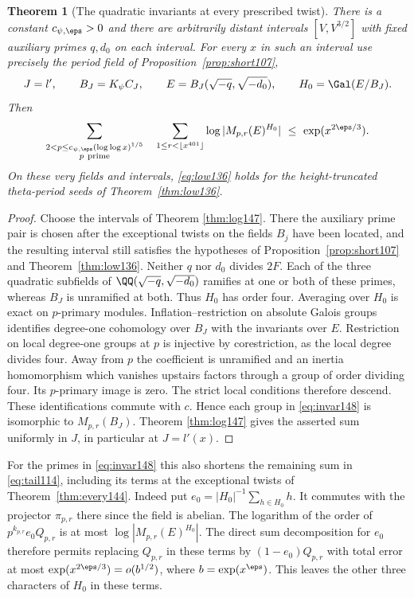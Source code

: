 \documentclass[a4paper,11pt]{article}
\newtheorem{theorem}[proposition]{Theorem}
\theoremstyle{definition}
\theoremstyle{remark}
\numberwithin{equation}{section}
\begin{document}
\begin{theorem}[The quadratic invariants at every prescribed twist]
\label{thm:invar148}
There is a constant \(c_{\psi,\eps}>0\) and there are arbitrarily
distant intervals \([V,V^{3/2}]\) with fixed auxiliary primes
\(q,d_0\) on each interval. For every \(x\) in such an interval
use precisely the period field of Proposition~\ref{prop:short107},
\[
  J=l',\qquad B_J=K_\psi C_J,\qquad
  E=B_J(\sqrt{-q},\sqrt{-d_0}),\qquad H_0=\Gal(E/B_J).
\]
Then
\begin{equation}
 \sum_{\substack{2<p\le c_{\psi,\eps}(\log\log x)^{1/5}\\
                        p\ {\rm prime}}}
       \quad\sum_{1\le r<\lfloor x^{401}\rfloor}
         \log|M_{p,r}(E)^{H_0}|\ \le\ \exp(x^{2\eps/3}).
 \label{eq:invar148}
\end{equation}
On these very fields and intervals, \eqref{eq:low136} holds for
the height-truncated theta-period seeds of
Theorem~\ref{thm:low136}.
\end{theorem}
\begin{proof}
Choose the intervals of
Theorem \ref{thm:log147}.
There the auxiliary prime pair is chosen after the exceptional
twists on the fields \(B_j\) have been located, and the resulting
interval still satisfies the hypotheses of
Proposition~\ref{prop:short107} and Theorem~\ref{thm:low136}.
Neither \(q\) nor \(d_0\) divides \(2F\). Each of the three
quadratic subfields of \(\QQ(\sqrt{-q},\sqrt{-d_0})\) ramifies
at one or both of these primes, whereas \(B_J\) is unramified
at both. Thus \(H_0\) has order four. Averaging over \(H_0\)
is exact on \(p\)-primary modules. Inflation--restriction on
absolute Galois groups identifies degree-one cohomology over
\(B_J\) with the invariants over \(E\). Restriction on local
degree-one groups at \(p\) is injective by corestriction, as
the local degree divides four. Away from \(p\) the coefficient
is unramified and an inertia homomorphism which vanishes
upstairs factors through a group of order dividing four.
Its \(p\)-primary image is zero. The strict local conditions
therefore descend. These identifications commute with \(c\).
Hence each group in \eqref{eq:invar148} is isomorphic to
\(M_{p,r}(B_J)\). Theorem \ref{thm:log147} gives the asserted
sum uniformly in \(J\), in particular at \(J=l'(x)\).
\end{proof}

For the primes in \eqref{eq:invar148} this also shortens
the remaining sum in \eqref{eq:tail114}, including its terms
at the exceptional twists of Theorem~\ref{thm:every144}.
Indeed put \(e_0=|H_0|^{-1}\sum_{h\in H_0} h\). It commutes
with the projector \(\pi_{p,r}\) there since the field is
abelian. The logarithm of the order of
\(p^{k_{p,r}}e_0 Q_{p,r}\) is at most
\(\log|M_{p,r}(E)^{H_0}|\). The direct sum decomposition for
\(e_0\) therefore permits replacing \(Q_{p,r}\) in these terms
by \((1-e_0)Q_{p,r}\) with total error at most
\(\exp(x^{2\eps/3})=o(b^{1/2})\), where \(b=\exp(x^\eps)\).
This leaves the other three characters of \(H_0\) in these
terms.
\end{document}
